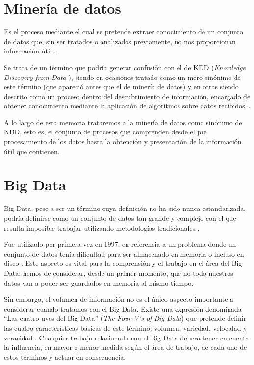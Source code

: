 

\section{Minería de datos}\label{DefMineria}

Es el proceso mediante el cual se pretende extraer conocimiento de un conjunto de datos que, sin ser tratados o analizados previamente, no nos proporcionan información útil \cite{DataMiningConcepts}.

Se trata de un término que podría generar confusión con el de KDD (\textit{Knowledge Discovery from Data} \cite{fayyad1996data}), siendo en ocasiones tratado como un mero sinónimo de este término (que apareció antes que el de minería de datos) y en otras siendo descrito como un proceso dentro del descubrimiento de información, encargado de obtener conocimiento mediante la aplicación de algoritmos sobre datos recibidos~\cite{DataMiningConcepts}. 

A lo largo de esta memoria trataremos a la minería de datos como sinónimo de KDD, esto es, el conjunto de procesos que comprenden desde el pre procesamiento de los datos hasta la obtención y presentación de la información útil que contienen.

\section{Big Data}\label{sec:defBigData}

Big Data, pese a ser un término cuya definición no ha sido nunca estandarizada, podría definirse como un conjunto de datos tan grande y complejo con el que resulta imposible trabajar utilizando metodologías tradicionales \cite{bigDataDef}.

Fue utilizado por primera vez en 1997, en referencia a un problema donde un conjunto de datos tenía dificultad para ser almacenado en memoria o incluso en disco \cite{forbesBigData,cox1997application}. Este aspecto es vital para la comprensión y el trabajo en el área del Big Data: hemos de considerar, desde un primer momento, que no todo nuestros datos van a poder ser guardados en memoria al mismo tiempo.

Sin embargo, el volumen de información no es el único aspecto importante a considerar cuando tratamos con el Big Data. Existe una expresión denominada ``Las cuatro uves del Big Data'' (\textit{The Four V's of Big Data}) que pretende definir las cuatro características básicas de este término: volumen, variedad, velocidad y veracidad \cite{IBMBigData4Vs}. Cualquier trabajo relacionado con el Big Data deberá tener en cuenta la influencia, en mayor o menor medida según el área de trabajo, de cada uno de estos términos y actuar en consecuencia.

